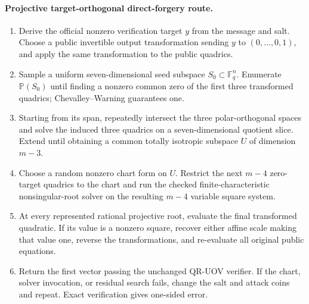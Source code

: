 \documentclass[11pt,a4paper]{article}
\theoremstyle{definition}
\theoremstyle{remark}
\newcommand{\F}{\mathbb F}
\begin{document}
\paragraph{Projective target-orthogonal direct-forgery route.}
\begin{enumerate}
\item Derive the official nonzero verification target $y$ from the message and
salt.  Choose a public invertible output transformation sending $y$ to
$(0,\ldots,0,1)$, and apply the same transformation to the public quadrics.
\item Sample a uniform seven-dimensional seed subspace $S_0\subset\F_q^n$.
Enumerate $\mathbb P(S_0)$ until finding a nonzero common zero of the first
three transformed quadrics; Chevalley--Warning guarantees one.
\item Starting from its span, repeatedly intersect the three polar-orthogonal
spaces and solve the induced three quadrics on a seven-dimensional quotient
slice.  Extend until obtaining a common totally isotropic subspace $U$ of
dimension $m-3$.
\item Choose a random nonzero chart form on $U$.  Restrict the next $m-4$
zero-target quadrics to the chart and run the checked finite-characteristic
nonsingular-root solver on the resulting $m-4$ variable square system.
\item At every represented rational projective root, evaluate the final
transformed quadratic.  If its value is a nonzero square, recover either affine
scale making that value one, reverse the transformations, and re-evaluate all
original public equations.
\item Return the first vector passing the unchanged QR-UOV verifier.  If the
chart, solver invocation, or residual search fails, change the salt and attack
coins and repeat.  Exact verification gives one-sided error.
\end{enumerate}
\end{document}
